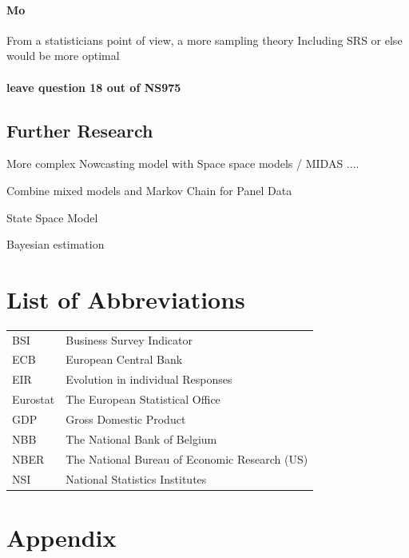 \documentclass[12pt,a4paper,oneside]{book}
\begin{document}
\subsubsection*{Mo}
From a statisticians point of view, a more sampling theory Including SRS or else would be more optimal

\subsubsection{leave question 18 out of NS975}

\section{Further Research}



More complex Nowcasting model with Space space models / MIDAS ....

Combine mixed models and Markov Chain for Panel Data \citep{de_haan-rietdijk_use_2017} 

State Space Model

Bayesian estimation \cite{bialowolski_bayesian_nodate}

\nocite{hlavac_stargazer:_2018}


 

\chapter*{List of Abbreviations}

\begin{tabular}{l l}
  BSI   & Business Survey Indicator \\
  ECB   & European Central Bank \\
  EIR   & Evolution in individual Responses \\
  Eurostat & The European Statistical Office \\
  GDP   & Gross Domestic Product \\
  NBB   & The National Bank of Belgium \\
  NBER  & The National Bureau of Economic Research (US) \\
  NSI   & National Statistics Institutes
\end{tabular}

  
\begin{appendix}
  \listoffigures
  \listoftables
\end{appendix}


\chapter*{Appendix}
\end{document}
